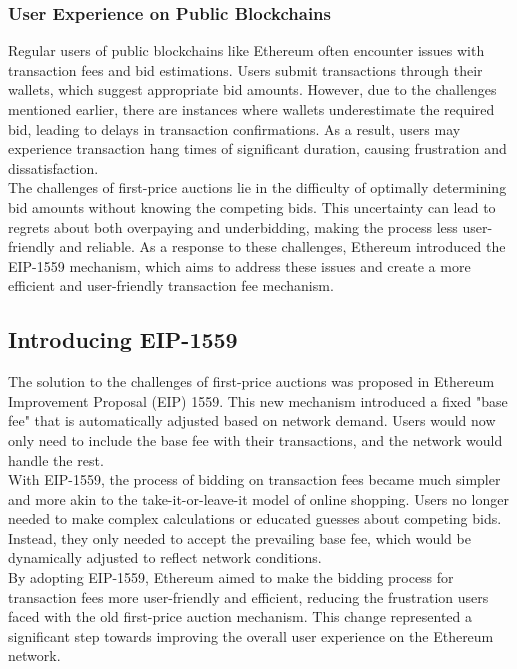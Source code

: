 \subsubsection{User Experience on Public Blockchains}
Regular users of public blockchains like Ethereum often encounter issues with transaction fees and bid estimations. Users submit transactions through their wallets, which suggest appropriate bid amounts. However, due to the challenges mentioned earlier, there are instances where wallets underestimate the required bid, leading to delays in transaction confirmations. As a result, users may experience transaction hang times of significant duration, causing frustration and dissatisfaction.\\

The challenges of first-price auctions lie in the difficulty of optimally determining bid amounts without knowing the competing bids. This uncertainty can lead to regrets about both overpaying and underbidding, making the process less user-friendly and reliable. As a response to these challenges, Ethereum introduced the EIP-1559 mechanism, which aims to address these issues and create a more efficient and user-friendly transaction fee mechanism.

\subsection{Introducing EIP-1559}
The solution to the challenges of first-price auctions was proposed in Ethereum Improvement Proposal (EIP) 1559. This new mechanism introduced a fixed "base fee" that is automatically adjusted based on network demand. Users would now only need to include the base fee with their transactions, and the network would handle the rest.\\

With EIP-1559, the process of bidding on transaction fees became much simpler and more akin to the take-it-or-leave-it model of online shopping. Users no longer needed to make complex calculations or educated guesses about competing bids. Instead, they only needed to accept the prevailing base fee, which would be dynamically adjusted to reflect network conditions.\\

By adopting EIP-1559, Ethereum aimed to make the bidding process for transaction fees more user-friendly and efficient, reducing the frustration users faced with the old first-price auction mechanism. This change represented a significant step towards improving the overall user experience on the Ethereum network.

